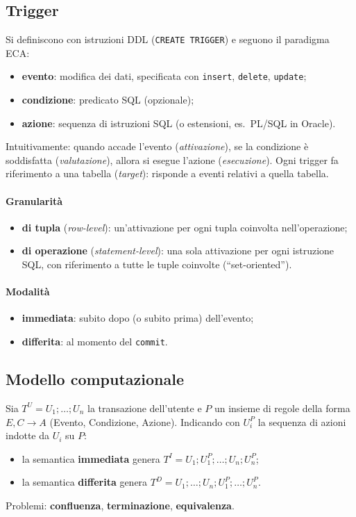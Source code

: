 \documentclass[a4paper,12pt]{article}
\begin{document}
\subsection{Trigger}

Si definiscono con istruzioni DDL (\texttt{CREATE TRIGGER}) e seguono il
paradigma ECA:
\begin{itemize}
  \item \textbf{evento}: modifica dei dati, specificata con
    \texttt{insert}, \texttt{delete}, \texttt{update};
  \item \textbf{condizione}: predicato SQL (opzionale);
  \item \textbf{azione}: sequenza di istruzioni SQL (o estensioni, es.\
    PL/SQL in Oracle).
\end{itemize}
Intuitivamente: quando accade l'evento (\emph{attivazione}), se la condizione
è soddisfatta (\emph{valutazione}), allora si esegue l'azione
(\emph{esecuzione}). Ogni trigger fa riferimento a una tabella
(\emph{target}): risponde a eventi relativi a quella tabella.

\paragraph{Granularità}
\begin{itemize}
  \item \textbf{di tupla} (\emph{row-level}): un'attivazione per ogni tupla
    coinvolta nell'operazione;
  \item \textbf{di operazione} (\emph{statement-level}): una sola
    attivazione per ogni istruzione SQL, con riferimento a tutte le tuple
    coinvolte (``set-oriented'').
\end{itemize}

\paragraph{Modalità}
\begin{itemize}
  \item \textbf{immediata}: subito dopo (o subito prima) dell'evento;
  \item \textbf{differita}: al momento del \texttt{commit}.
\end{itemize}

\subsection{Modello computazionale}

Sia $T^U = U_1; \dots; U_n$ la transazione dell'utente e $P$ un insieme di
regole della forma $E, C \to A$ (Evento, Condizione, Azione). Indicando con
$U_i^P$ la sequenza di azioni indotte da $U_i$ su $P$:
\begin{itemize}
  \item la semantica \textbf{immediata} genera
    $T^I = U_1; U_1^P; \dots; U_n; U_n^P$;
  \item la semantica \textbf{differita} genera
    $T^D = U_1; \dots; U_n; U_1^P; \dots; U_n^P$.
\end{itemize}
Problemi: \textbf{confluenza}, \textbf{terminazione}, \textbf{equivalenza}.
\end{document}
